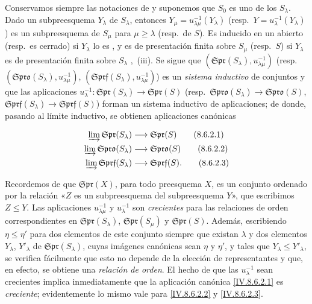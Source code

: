\begin{env}[8.6.2]
\label{IV.8.6.2}
Conservamos siempre las notaciones de  y suponemos que $S_0$ es uno de los $S_\lambda$.
Dado un subpreesquema $Y_\lambda$ de $S_\lambda$, entonces $Y_\mu=u_{\lambda\mu}^{-1}(Y_\lambda)$ (resp.\ $Y=u_\lambda^{-1}(Y_\lambda)$) es un subpreesquema de $S_\mu$ para $\mu\geqslant\lambda$ (resp.\ de $S$). Es inducido en un abierto (resp.\ es cerrado) si $Y_\lambda$ lo es , y es de presentación finita sobre $S_\mu$ (resp.\ $S$) si $Y_\lambda$ es de presentación finita sobre $S_\lambda$ ,~(iii). Se sigue que $(\mathfrak{Spr}(S_\lambda),u_{\lambda\mu}^{-1})$ (resp.\ $(\mathfrak{Spro}(S_\lambda),u_{\lambda\mu}^{-1})$, $(\mathfrak{Sprf}(S_\lambda),u_{\lambda\mu}^{-1})$) es un \emph{sistema inductivo} de conjuntos y que las aplicaciones $u_\lambda^{-1}:\mathfrak{Spr}(S_\lambda)\to\mathfrak{Spr}(S)$ (resp.\ $\mathfrak{Spro}(S_\lambda)\to\mathfrak{Spro}(S)$, $\mathfrak{Sprf}(S_\lambda)\to\mathfrak{Sprf}(S)$) forman un sistema inductivo de aplicaciones; de donde, pasando al límite inductivo, se obtienen aplicaciones canónicas
\end{env}

\begin{align}
  \varinjlim \mathfrak{Spr}(S_\lambda) &\to \mathfrak{Spr}(S) \tag{8.6.2.1}\label{IV.8.6.2.1}\\
  \varinjlim \mathfrak{Spro}(S_\lambda) &\to \mathfrak{Spro}(S) \tag{8.6.2.2}\label{IV.8.6.2.2}\\
  \varinjlim \mathfrak{Sprf}(S_\lambda) &\to \mathfrak{Sprf}(S). \tag{8.6.2.3}\label{IV.8.6.2.3}
\end{align}


Recordemos de  que $\mathfrak{Spr}(X)$, para todo preesquema $X$, es un conjunto ordenado por la relación «$Z$ es un subpreesquema del subpreesquema $Y$», que escribimos $Z\leqslant Y$.
Las aplicaciones $u_{\lambda\mu}^{-1}$ y $u_\lambda^{-1}$ son \emph{crecientes} para las relaciones de orden correspondientes en $\mathfrak{Spr}(S_\lambda)$, $\mathfrak{Spr}(S_\mu)$ y $\mathfrak{Spr}(S)$.
Además, escribiendo $\eta\leqslant\eta'$ para dos elementos de este conjunto siempre que existan $\lambda$ y dos elementos $Y_\lambda$, $Y'_\lambda$ de $\mathfrak{Spr}(S_\lambda)$, cuyas imágenes canónicas sean $\eta$ y $\eta'$, y tales que $Y_\lambda\leqslant Y'_\lambda$, se verifica fácilmente que esto no depende de la elección de representantes y que, en efecto, se obtiene una \emph{relación de orden}.
El hecho de que las $u_\lambda^{-1}$ sean crecientes implica inmediatamente que la aplicación canónica \eqref{IV.8.6.2.1} es \emph{creciente}; evidentemente lo mismo vale para \eqref{IV.8.6.2.2} y \eqref{IV.8.6.2.3}.

